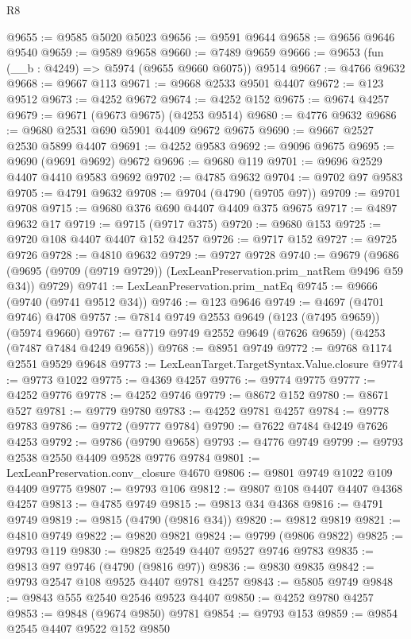 \begin{lexlean}{R8}
\begin{coremodule}
@9655 := @9585 @5020 @5023
@9656 := @9591 @9644
@9658 := @9656 @9646 @9540
@9659 := @9589 @9658
@9660 := @7489 @9659
@9666 := @9653 (fun (__b : @4249) => @5974 (@9655 @9660 @6075)) @9514
@9667 := @4766 @9632
@9668 := @9667 @113
@9671 := @9668 @2533 @9501 @4407
@9672 := @123 @9512
@9673 := @4252 @9672
@9674 := @4252 @152
@9675 := @9674 @4257
@9679 := @9671 (@9673 @9675) (@4253 @9514)
@9680 := @4776 @9632
@9686 := @9680 @2531 @690 @5901 @4409 @9672 @9675
@9690 := @9667 @2527 @2530 @5899 @4407
@9691 := @4252 @9583
@9692 := @9096 @9675
@9695 := @9690 (@9691 @9692) @9672
@9696 := @9680 @119
@9701 := @9696 @2529 @4407 @4410 @9583 @9692
@9702 := @4785 @9632
@9704 := @9702 @97 @9583
@9705 := @4791 @9632
@9708 := @9704 (@4790 (@9705 @97))
@9709 := @9701 @9708
@9715 := @9680 @376 @690 @4407 @4409 @375 @9675
@9717 := @4897 @9632 @17
@9719 := @9715 (@9717 @375)
@9720 := @9680 @153
@9725 := @9720 @108 @4407 @4407 @152 @4257
@9726 := @9717 @152
@9727 := @9725 @9726
@9728 := @4810 @9632
@9729 := @9727 @9728
@9740 := @9679
    (@9686 (@9695 (@9709 (@9719 @9729)) (LexLeanPreservation.prim_natRem @9496 @59 @34)) @9729)
@9741 := LexLeanPreservation.prim_natEq
@9745 := @9666 (@9740 (@9741 @9512 @34))
@9746 := @123 @9646
@9749 := @4697 (@4701 @9746) @4708
@9757 := @7814 @9749 @2553 @9649 (@123 (@7495 @9659)) (@5974 @9660)
@9767 := @7719 @9749 @2552 @9649 (@7626 @9659) (@4253 (@7487 @7484 @4249 @9658))
@9768 := @8951 @9749
@9772 := @9768 @1174 @2551 @9529 @9648
@9773 := LexLeanTarget.TargetSyntax.Value.closure
@9774 := @9773 @1022
@9775 := @4369 @4257
@9776 := @9774 @9775
@9777 := @4252 @9776
@9778 := @4252 @9746
@9779 := @8672 @152
@9780 := @8671 @527
@9781 := @9779 @9780
@9783 := @4252 @9781 @4257
@9784 := @9778 @9783
@9786 := @9772 (@9777 @9784)
@9790 := @7622 @7484 @4249 @7626 @4253
@9792 := @9786 (@9790 @9658)
@9793 := @4776 @9749
@9799 := @9793 @2538 @2550 @4409 @9528 @9776 @9784
@9801 := LexLeanPreservation.conv_closure @4670
@9806 := @9801 @9749 @1022 @109 @4409 @9775
@9807 := @9793 @106
@9812 := @9807 @108 @4407 @4407 @4368 @4257
@9813 := @4785 @9749
@9815 := @9813 @34 @4368
@9816 := @4791 @9749
@9819 := @9815 (@4790 (@9816 @34))
@9820 := @9812 @9819
@9821 := @4810 @9749
@9822 := @9820 @9821
@9824 := @9799 (@9806 @9822)
@9825 := @9793 @119
@9830 := @9825 @2549 @4407 @9527 @9746 @9783
@9835 := @9813 @97 @9746 (@4790 (@9816 @97))
@9836 := @9830 @9835
@9842 := @9793 @2547 @108 @9525 @4407 @9781 @4257
@9843 := @5805 @9749
@9848 := @9843 @555 @2540 @2546 @9523 @4407
@9850 := @4252 @9780 @4257
@9853 := @9848 (@9674 @9850) @9781
@9854 := @9793 @153
@9859 := @9854 @2545 @4407 @9522 @152 @9850

\end{coremodule}
\end{lexlean}
